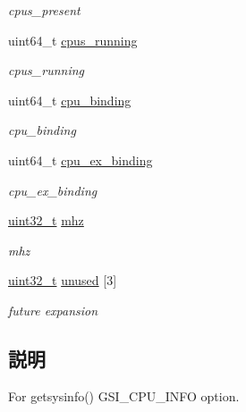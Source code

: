 \begin{DoxyCompactItemize}
\begin{DoxyCompactList}\small\item\em cpus\_\-present \item\end{DoxyCompactList}\item 
uint64\_\-t \hyperlink{structTru64_1_1cpu__info_a7214e080781778954dc11356fd39bd09}{cpus\_\-running}
\begin{DoxyCompactList}\small\item\em cpus\_\-running \item\end{DoxyCompactList}\item 
uint64\_\-t \hyperlink{structTru64_1_1cpu__info_ad785dd4acdf2b025d47237c0cc60ab83}{cpu\_\-binding}
\begin{DoxyCompactList}\small\item\em cpu\_\-binding \item\end{DoxyCompactList}\item 
uint64\_\-t \hyperlink{structTru64_1_1cpu__info_afa2e4ea220df3f99687c22142a93788e}{cpu\_\-ex\_\-binding}
\begin{DoxyCompactList}\small\item\em cpu\_\-ex\_\-binding \item\end{DoxyCompactList}\item 
\hyperlink{Type_8hh_a435d1572bf3f880d55459d9805097f62}{uint32\_\-t} \hyperlink{structTru64_1_1cpu__info_a83860928a4faeb84e30409273ff5c131}{mhz}
\begin{DoxyCompactList}\small\item\em mhz \item\end{DoxyCompactList}\item 
\hyperlink{Type_8hh_a435d1572bf3f880d55459d9805097f62}{uint32\_\-t} \hyperlink{structTru64_1_1cpu__info_a636f5e28f6df8b80216977d9f5adb246}{unused} \mbox{[}3\mbox{]}
\begin{DoxyCompactList}\small\item\em future expansion \item\end{DoxyCompactList}\end{DoxyCompactItemize}


\subsection{説明}
For getsysinfo() GSI\_\-CPU\_\-INFO option. 

